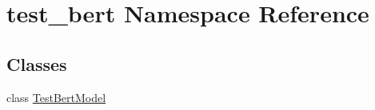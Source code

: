 \hypertarget{namespacetest__bert}{}\section{test\+\_\+bert Namespace Reference}
\label{namespacetest__bert}
\subsection*{Classes}
\begin{DoxyCompactItemize}
\item 
class \hyperlink{classtest__bert_1_1TestBertModel}{Test\+Bert\+Model}
\end{DoxyCompactItemize}
